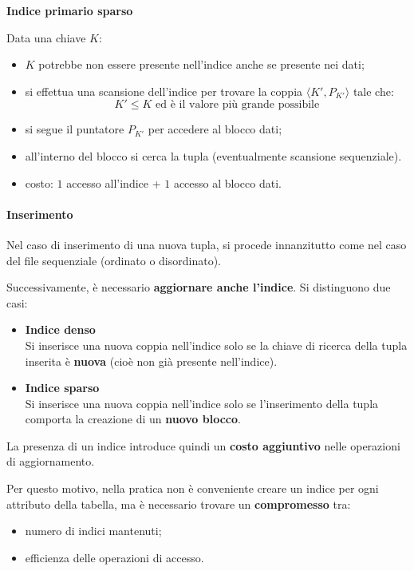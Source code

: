 \textbf{Indice primario sparso}

Data una chiave $K$:

\begin{itemize}
	\item $K$ potrebbe non essere presente nell'indice anche se presente nei dati;
	
	\item si effettua una scansione dell'indice per trovare la coppia $\langle K', P_{K'} \rangle$ tale che:
	\[
	K' \leq K \text{ ed è il valore più grande possibile}
	\]
	
	\item si segue il puntatore $P_{K'}$ per accedere al blocco dati;
	
	\item all'interno del blocco si cerca la tupla (eventualmente scansione sequenziale).
	
	\item costo: $1$ accesso all'indice + $1$ accesso al blocco dati.
\end{itemize}
\paragraph{Inserimento}

Nel caso di inserimento di una nuova tupla, si procede innanzitutto come nel caso del file sequenziale (ordinato o disordinato).

Successivamente, è necessario \textbf{aggiornare anche l'indice}. Si distinguono due casi:

\begin{itemize}
	\item \textbf{Indice denso} \\
	Si inserisce una nuova coppia nell'indice solo se la chiave di ricerca della tupla inserita è \textbf{nuova} (cioè non già presente nell'indice).
	
	\item \textbf{Indice sparso} \\
	Si inserisce una nuova coppia nell'indice solo se l'inserimento della tupla comporta la creazione di un \textbf{nuovo blocco}.
\end{itemize}

La presenza di un indice introduce quindi un \textbf{costo aggiuntivo} nelle operazioni di aggiornamento.

Per questo motivo, nella pratica non è conveniente creare un indice per ogni attributo della tabella, ma è necessario trovare un \textbf{compromesso} tra:
\begin{itemize}
	\item numero di indici mantenuti;
	\item efficienza delle operazioni di accesso.
\end{itemize}

